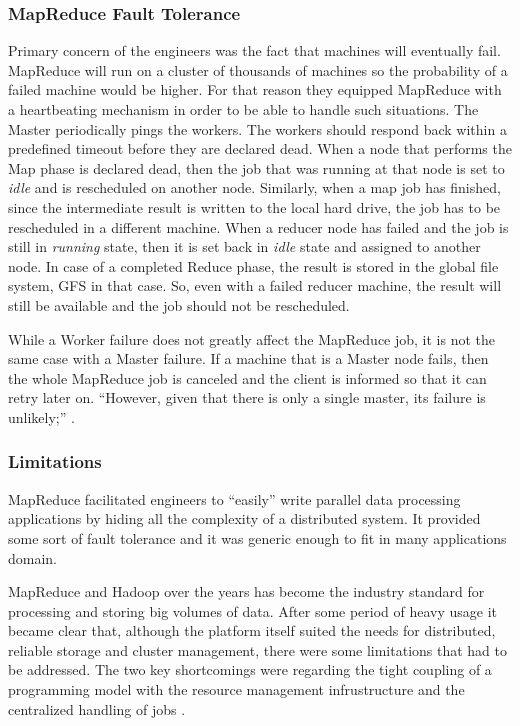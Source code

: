 \subsubsection{MapReduce Fault Tolerance}
Primary concern of the engineers was the fact
that machines will eventually fail. MapReduce will run on a cluster of
thousands of machines so the probability of a failed machine would be
higher. For that reason they equipped MapReduce with a heartbeating
mechanism in order to be able to handle such situations.
The Master periodically pings the workers. The workers should respond back
within a predefined timeout before they are declared dead. When a node
that performs the Map phase is declared dead, then the job that was
running at that node is set to \emph{idle} and is rescheduled on
another node. Similarly, when a map job has finished, since the
intermediate result is written to the local hard drive, the job has to
be rescheduled in a different machine. When a reducer node has failed
and the job is still in \emph{running} state, then it is set back in
\emph{idle} state and assigned to another node. In case of a completed
Reduce phase, the result is stored in the global file system, GFS in
that case. So, even with a failed reducer machine, the result will
still be available and the job should not be rescheduled.

While a Worker failure does not greatly affect the MapReduce job, it
is not the same case with a Master failure. If a machine that is a
Master node fails, then the whole MapReduce job is canceled and the
client is informed so that it can retry later on. ``However, given
that there is only a single master, its failure is unlikely;''
\cite{Dean:2004:MSD:1251254.1251264}.

\subsubsection{Limitations}
MapReduce facilitated engineers to ``easily'' write parallel data
processing applications by hiding all the complexity of a distributed
system. It provided some sort of fault tolerance and it was generic
enough to fit in many applications domain.

MapReduce and Hadoop over the years has become the industry standard
for processing and storing big volumes of data. After some period of
heavy usage it became clear that, although the platform itself suited
the needs for distributed, reliable storage and cluster management,
there were some limitations that had to be addressed. The two key
shortcomings were regarding the tight coupling of a programming model
with the resource management infrustructure and the centralized
handling of jobs \cite{Vavilapalli:2013:AHY:2523616.2523633, 6680946}.

